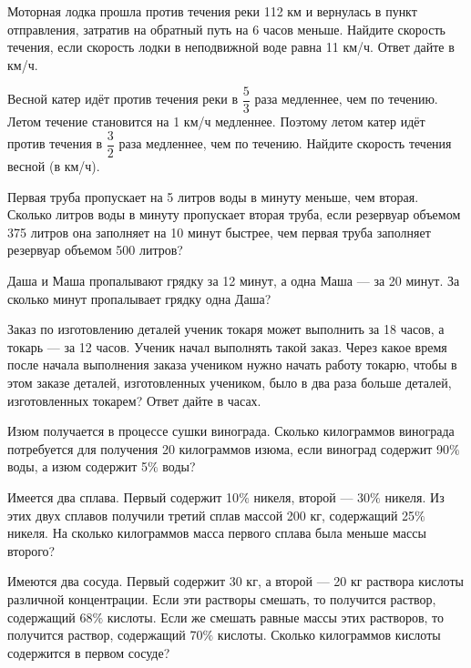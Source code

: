 \newpage

\hspace{3mm}

 Моторная лодка прошла против течения реки 112 км и вернулась в пункт отправления, затратив на обратный путь на 6 часов меньше. Найдите скорость течения, если скорость лодки в неподвижной воде равна 11 км/ч. Ответ дайте в км/ч.

 Весной катер идёт против течения реки в $\dfrac{5}{3}$ раза медленнее, чем по течению. Летом течение становится на 1 км/ч медленнее. Поэтому летом катер идёт против течения в $\dfrac{3}{2}$ раза медленнее, чем по течению. Найдите скорость течения весной (в км/ч).

 Первая труба пропускает на 5 литров воды в минуту меньше, чем вторая. Сколько литров воды в минуту пропускает вторая труба, если резервуар объемом 375 литров она заполняет на 10 минут быстрее, чем первая труба заполняет резервуар объемом 500 литров?

 Даша и Маша пропалывают грядку за 12 минут, а одна Маша — за 20 минут. За сколько минут пропалывает грядку одна Даша?

 Заказ по изготовлению деталей ученик токаря может выполнить за 18 часов, а токарь — за 12 часов. Ученик начал выполнять такой заказ. Через какое время после начала выполнения заказа учеником нужно начать работу токарю, чтобы в этом заказе деталей, изготовленных учеником, было в два раза больше деталей, изготовленных токарем? Ответ дайте в часах.

 Изюм получается в процессе сушки винограда. Сколько килограммов винограда потребуется для получения 20 килограммов изюма, если виноград содержит 90$\%$ воды, а изюм содержит 5$\%$ воды?

 Имеется два сплава. Первый содержит 10$\%$ никеля, второй — 30$\%$ никеля. Из этих двух сплавов получили третий сплав массой 200 кг, содержащий 25$\%$ никеля. На сколько килограммов масса первого сплава была меньше массы второго?

 Имеются два сосуда. Первый содержит 30 кг, а второй — 20 кг раствора кислоты различной концентрации. Если эти растворы смешать, то получится раствор, содержащий 68$\%$ кислоты. Если же смешать равные массы этих растворов, то получится раствор, содержащий 70$\%$ кислоты. Сколько килограммов кислоты содержится в первом сосуде?